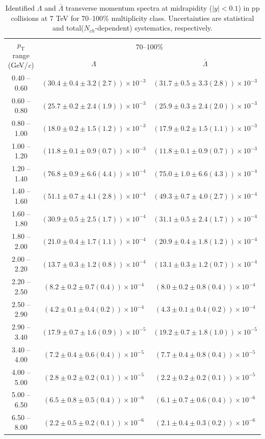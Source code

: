 \begin{table}
\caption{Identified $\Lambda$ and $\bar{\Lambda}$  transverse momentum spectra at midrapidity ($|y|<0.1$) in pp collisions at 7 TeV for 70--100\% multiplicity class. Uncertainties are statistical and total($N_{ch}$-dependent) systematics, respectively.}
\label{tab:Lambda_AntiLambda_70to100}
\begin{center}
\begin{tabular}{ c | c c }
\hline
\multirow{2}{*}{$p_{\mathrm{T}}$ range (GeV/\textit{c})} & \multicolumn{2}{c}{70--100\%} \\ & $\Lambda$& $\bar{\Lambda}$\\ 
\hline
0.40 -- 0.60 & $(30.4\pm0.4\pm3.2(2.7))\times10^{-3}$ & $(31.7\pm0.5\pm3.3(2.8))\times10^{-3}$ \\ 
0.60 -- 0.80 & $(25.7\pm0.2\pm2.4(1.9))\times10^{-3}$ & $(25.9\pm0.3\pm2.4(2.0))\times10^{-3}$ \\ 
0.80 -- 1.00 & $(18.0\pm0.2\pm1.5(1.2))\times10^{-3}$ & $(17.9\pm0.2\pm1.5(1.1))\times10^{-3}$ \\ 
1.00 -- 1.20 & $(11.8\pm0.1\pm0.9(0.7))\times10^{-3}$ & $(11.8\pm0.1\pm0.9(0.7))\times10^{-3}$ \\ 
1.20 -- 1.40 & $(76.8\pm0.9\pm6.6(4.4))\times10^{-4}$ & $(75.0\pm1.0\pm6.6(4.3))\times10^{-4}$ \\ 
1.40 -- 1.60 & $(51.1\pm0.7\pm4.1(2.8))\times10^{-4}$ & $(49.3\pm0.7\pm4.0(2.7))\times10^{-4}$ \\ 
1.60 -- 1.80 & $(30.9\pm0.5\pm2.5(1.7))\times10^{-4}$ & $(31.1\pm0.5\pm2.4(1.7))\times10^{-4}$ \\ 
1.80 -- 2.00 & $(21.0\pm0.4\pm1.7(1.1))\times10^{-4}$ & $(20.9\pm0.4\pm1.8(1.2))\times10^{-4}$ \\ 
2.00 -- 2.20 & $(13.7\pm0.3\pm1.2(0.8))\times10^{-4}$ & $(13.1\pm0.3\pm1.2(0.7))\times10^{-4}$ \\ 
2.20 -- 2.50 & $(8.2\pm0.2\pm0.7(0.4))\times10^{-4}$ & $(8.0\pm0.2\pm0.8(0.4))\times10^{-4}$ \\ 
2.50 -- 2.90 & $(4.2\pm0.1\pm0.4(0.2))\times10^{-4}$ & $(4.3\pm0.1\pm0.4(0.2))\times10^{-4}$ \\ 
2.90 -- 3.40 & $(17.9\pm0.7\pm1.6(0.9))\times10^{-5}$ & $(19.2\pm0.7\pm1.8(1.0))\times10^{-5}$ \\ 
3.40 -- 4.00 & $(7.2\pm0.4\pm0.6(0.4))\times10^{-5}$ & $(7.7\pm0.4\pm0.8(0.4))\times10^{-5}$ \\ 
4.00 -- 5.00 & $(2.8\pm0.2\pm0.2(0.1))\times10^{-5}$ & $(2.2\pm0.2\pm0.2(0.1))\times10^{-5}$ \\ 
5.00 -- 6.50 & $(6.5\pm0.8\pm0.5(0.4))\times10^{-6}$ & $(6.1\pm0.7\pm0.6(0.4))\times10^{-6}$ \\ 
6.50 -- 8.00 & $(2.2\pm0.5\pm0.2(0.1))\times10^{-6}$ & $(2.1\pm0.4\pm0.3(0.2))\times10^{-6}$ \\ 
\hline
\end{tabular}
\end{center}
\end{table}
 
